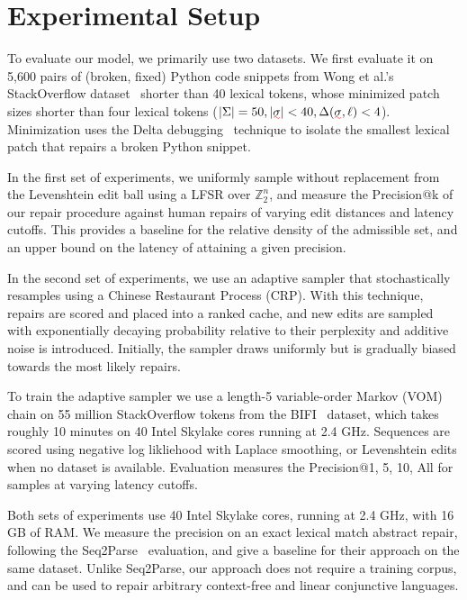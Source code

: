 \documentclass[sigplan,review,anonymous,acmsmall]{acmart}\settopmatter{printfolios=false,printccs=false,printacmref=false}
\begin{document}
\section{Experimental Setup}

To evaluate our model, we primarily use two datasets. We first evaluate it on 5,600 pairs of (broken, fixed) Python code snippets from Wong et al.'s StackOverflow dataset~\cite{wong2019syntax} shorter than 40 lexical tokens, whose minimized patch sizes shorter than four lexical tokens ($|\Sigma| = 50, |\err{\sigma}| < 40, \Delta(\err{\sigma}, \ell) < 4$). Minimization uses the Delta debugging~\cite{zeller2002isolating} technique to isolate the smallest lexical patch that repairs a broken Python snippet.

In the first set of experiments, we uniformly sample without replacement from the Levenshtein edit ball using a LFSR over $\mathbb{Z}_2^n$, and measure the Precision@k of our repair procedure against human repairs of varying edit distances and latency cutoffs. This provides a baseline for the relative density of the admissible set, and an upper bound on the latency of attaining a given precision.

In the second set of experiments, we use an adaptive sampler that stochastically resamples using a Chinese Restaurant Process (CRP). With this technique, repairs are scored and placed into a ranked cache, and new edits are sampled with exponentially decaying probability relative to their perplexity and additive noise is introduced. Initially, the sampler draws uniformly but is gradually biased towards the most likely repairs.

To train the adaptive sampler we use a length-5 variable-order Markov (VOM) chain on 55 million StackOverflow tokens from the BIFI~\cite{yasunaga2021break} dataset, which takes roughly 10 minutes on 40 Intel Skylake cores running at 2.4 GHz. Sequences are scored using negative log likliehood with Laplace smoothing, or Levenshtein edits when no dataset is available. Evaluation measures the Precision@{1, 5, 10, All} for samples at varying latency cutoffs.

Both sets of experiments use 40 Intel Skylake cores, running at 2.4 GHz, with 16 GB of RAM. We measure the precision on an exact lexical match abstract repair, following the Seq2Parse~\cite{sakkas2022seq2parse} evaluation, and give a baseline for their approach on the same dataset. Unlike Seq2Parse, our approach does not require a training corpus, and can be used to repair arbitrary context-free and linear conjunctive languages.
\end{document}
